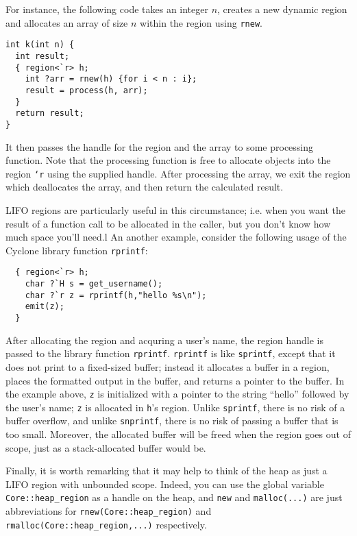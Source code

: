 For instance, the following code takes an integer $n$, creates
a new dynamic region and allocates an array of size
$n$ within the region using \texttt{rnew}.  
\begin{verbatim}
int k(int n) {
  int result;
  { region<`r> h;
    int ?arr = rnew(h) {for i < n : i};
    result = process(h, arr);
  }
  return result;
}
\end{verbatim}
It then passes the
handle for the region and the array to some processing function.
Note that the processing function is free to allocate objects
into the region \texttt{`r} using the supplied handle.  
After processing the array, we exit the region which deallocates
the array, and then return the calculated result.

LIFO regions are particularly useful in this circumstance; i.e. when
you want the result of a function call to be allocated in the caller,
but you don't know how much space you'll need.l An another example,
consider the following usage of the Cyclone library function
\texttt{rprintf}:
\begin{verbatim}
  { region<`r> h;
    char ?`H s = get_username();
    char ?`r z = rprintf(h,"hello %s\n");
    emit(z);
  }
\end{verbatim}
After allocating the region and acquring a user's name, the region
handle is passed to the library function \texttt{rprintf}.
\texttt{rprintf} is like \texttt{sprintf}, except that it does not
print to a fixed-sized buffer; instead it allocates a buffer in a
region, places the formatted output in the buffer, and returns a
pointer to the buffer.  In the example above, \texttt{z} is
initialized with a pointer to the string ``hello'' followed by the
user's name; \texttt{z} is allocated in \texttt{h}'s region.  Unlike
\texttt{sprintf}, there is no risk of a buffer overflow, and unlike
\texttt{snprintf}, there is no risk of passing a buffer that is too
small.  Moreover, the allocated buffer will be freed when the region
goes out of scope, just as a stack-allocated buffer would be.

Finally, it is worth remarking that it may help to think of the heap
as just a LIFO region with unbounded scope.  Indeed, you can use the
global variable \texttt{Core::heap_region} as a handle on the heap,
and \texttt{new} and \texttt{malloc(...)}  are just abbreviations for
\texttt{rnew(Core::heap_region)} and
\texttt{rmalloc(Core::heap_region,...)} respectively.


